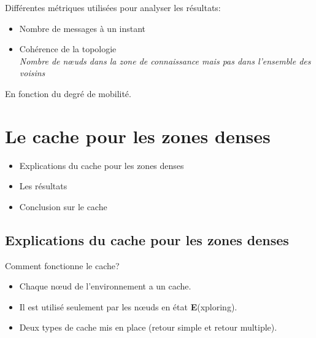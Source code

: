 \documentclass{beamer}
\begin{document}
  \begin{frame}
	Différentes métriques utilisées pour analyser les résultats:
	\begin{itemize}
		\item Nombre de messages à un instant 
		\item Cohérence de la topologie \\ \textit{\footnotesize{Nombre de nœuds dans la zone de connaissance mais pas dans l'ensemble des voisins}}
	\end{itemize}
	\vspace{5mm}
	En fonction du degré de mobilité.
  \end{frame}

  \section{Le cache pour les zones denses}
  \begin{frame}
	\vspace{1cm}
	\begin{itemize}
		\item Explications du cache pour les zones denses
		\item Les résultats 
		\item Conclusion sur le cache
	\end{itemize}
  \end{frame}
  
  \subsection{Explications du cache pour les zones denses}
  \begin{frame}
	Comment fonctionne le cache?
	\begin{itemize}
 		\item Chaque nœud de l'environnement a un cache.
		\item Il est utilisé seulement par les nœuds en état \textbf{E}(xploring).
		\item Deux types de cache mis en place (retour simple et retour multiple).
	\end{itemize}
  \end{frame}
\end{document}
